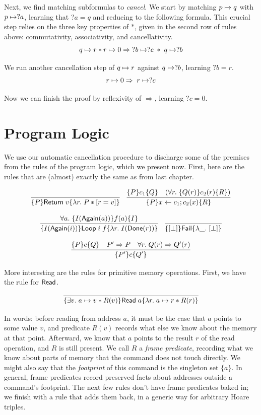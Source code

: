 \documentclass{amsbook}
\theoremstyle{definition}
\theoremstyle{remark}
\numberwithin{section}{chapter}
\numberwithin{equation}{chapter}
\begin{document}
Next, we find matching subformulas to \emph{cancel}.
We start by matching $p \mapsto q$ with $p \mapsto ?a$, learning that $?a = q$ and reducing to the following formula.
This crucial step relies on the three key properties of $*$, given in the second row of rules above: commutativity, associativity, and cancellativity.
$$q \mapsto r * r \mapsto 0 \Rightarrow \; ?b \mapsto ?c \; * \; q \mapsto ?b$$

We run another cancellation step of $q \mapsto r$ against $q \mapsto ?b$, learning $?b = r$.
$$r \mapsto 0 \Rightarrow \; r \mapsto ?c$$

Now we can finish the proof by reflexivity of $\Rightarrow$, learning $?c = 0$.

\section{Program Logic}

We use our automatic cancellation procedure to discharge some of the premises from the rules of the program logic, which we present now.
First, here are the rules that are (almost) exactly the same as from last chapter.

$$\infer{\hoare{P}{\mt{Return} \; v}{\lambda r. \; P * \lift{r = v}}}{}
\quad \infer{\hoare{P}{x \leftarrow c_1; c_2(x)}{R}}{
  \hoare{P}{c_1}{Q}
  & (\forall r. \; \hoare{Q(r)}{c_2(r)}{R})
}$$

$$\infer{\hoare{I(\mt{Again}(i))}{\mt{Loop} \; i \; f}{\lambda r. \; I(\mt{Done}(r))}}{
  \forall a. \; \hoare{I(\mt{Again}(a))}{f(a)}{I}
}
\quad \infer{\hoare{\lift{\bot}}{\mt{Fail}}{\lambda \_. \; \lift{\bot}}}{}$$

$$\infer{\hoare{P'}{c}{Q'}}{
  \hoare{P}{c}{Q}
  & P' \Rightarrow P
  & \forall r. \; Q(r) \Rightarrow Q'(r)
}$$

More interesting are the rules for primitive memory operations.
First, we have the rule for $\mathsf{Read}$.

$$\infer{\hoare{\exists v. \; \ptsto{a}{v} * R(v)}{\mt{Read} \; a}{\lambda r. \; \ptsto{a}{r} * R(r)}}{}$$

In words: before reading from address $a$, it must be the case that $a$ points to some value $v$, and predicate $R(v)$ records what else we know about the memory at that point.
Afterward, we know that $a$ points to the result $r$ of the read operation, and $R$ is still present.
We call $R$ a \emph{frame predicate}, recording what we know about parts of memory that the command does not touch directly.
We might also say that the \emph{footprint} of this command is the singleton set $\{a\}$.
In general, frame predicates record preserved facts about addresses outside a command's footprint.
The next few rules don't have frame predicates baked in; we finish with a rule that adds them back, in a generic way for arbitrary Hoare triples.
\end{document}
